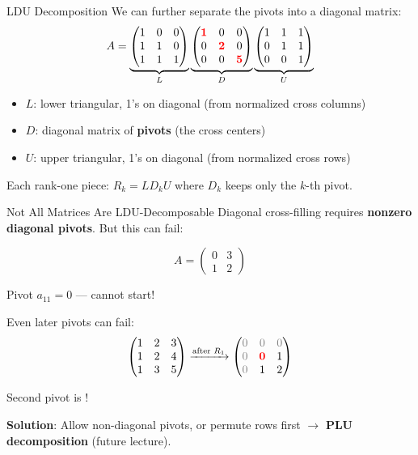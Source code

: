 \documentclass[10pt]{beamer}
\theoremstyle{definition}
\newcommand{\pvt}[1]{{\color{red}\mathbf{#1}}}       %
\newcommand{\rem}[1]{{\color{gray}#1}}                %
\newcommand{\x}[1]{\alert{\textbf{#1}}}
\begin{document}
\begin{frame}{LDU Decomposition}
We can further separate the pivots into a diagonal matrix:
$$A = \underbrace{\begin{pmatrix}
1 & 0 & 0 \\
1 & 1 & 0 \\
1 & 1 & 1
\end{pmatrix}}_{L}
\underbrace{\begin{pmatrix}
\pvt{1} & 0 & 0 \\
0 & \pvt{2} & 0 \\
0 & 0 & \pvt{5}
\end{pmatrix}}_{D}
\underbrace{\begin{pmatrix}
1 & 1 & 1 \\
0 & 1 & 1 \\
0 & 0 & 1
\end{pmatrix}}_{U}$$

\vfill
\begin{itemize}
\item $L$: lower triangular, 1's on diagonal (from normalized cross columns)
\item $D$: diagonal matrix of \x{pivots} (the cross centers)
\item $U$: upper triangular, 1's on diagonal (from normalized cross rows)
\end{itemize}

\vfill
Each rank-one piece: $R_k = L D_k U$ where $D_k$ keeps only the $k$-th pivot.
\end{frame}

\begin{frame}{Not All Matrices Are LDU-Decomposable}
Diagonal cross-filling requires \x{nonzero diagonal pivots}. But this can fail:

$$A = \begin{pmatrix} 0 & 3 \\ 1 & 2 \end{pmatrix}$$

Pivot $a_{11} = 0$ — cannot start!

\vfill
Even later pivots can fail:
$$\begin{pmatrix} 1 & 2 & 3 \\ 1 & 2 & 4 \\ 1 & 3 & 5 \end{pmatrix}
\xrightarrow{\text{after } R_1} \begin{pmatrix}
\rem{0} & \rem{0} & \rem{0} \\
\rem{0} & \pvt{0} & 1 \\
\rem{0} & 1 & 2
\end{pmatrix}$$

Second pivot is \pvt{zero}!

\vfill
\textbf{Solution}: Allow non-diagonal pivots, or permute rows first $\to$ \x{PLU decomposition} (future lecture).
\end{frame}
\end{document}

